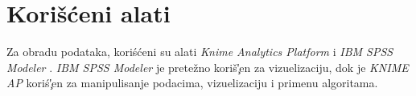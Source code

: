 \section{Kori\v{s}\'c{}eni alati}
\label{sec:Alati}

Za obradu podataka, kori\'s{}\'c{}eni su alati \emph{Knime Analytics Platform} \cite{KNIME} i \emph{IBM SPSS Modeler} \cite{SPSS}. \emph{IBM SPSS Modeler} je prete\v{z}no kori\v{s}\c'{}en za vizuelizaciju, dok je \emph{KNIME AP} kori\'s{}\c'{}en za manipulisanje podacima, vizuelizaciju i primenu algoritama.
